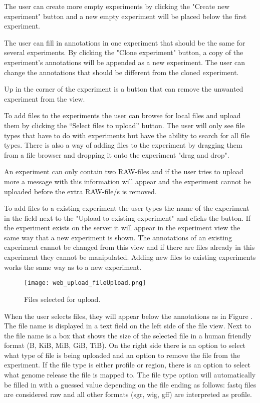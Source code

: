 The user can create more empty experiments by clicking the "Create new experiment" button and a new empty experiment will be placed below the first experiment.

The user can fill in annotations in one experiment that should be the same for several experiments. By clicking the "Clone experiment" button, a copy of the experiment's annotations will be appended as a new experiment. The user can change the annotations that should be different from the cloned experiment.

Up in the corner of the experiment is a button that can remove the unwanted experiment from the view. 

To add files to the experiments the user can browse for local files and upload them by clicking the “Select files to upload” button. The user will only see file types that have to do with experiments but have the ability to search for all file types. There is also a way of adding files to the experiment by dragging them from a file browser and dropping it onto the experiment "drag and drop".

An experiment can only contain two RAW-files and if the user tries to upload more a message with this information will appear and the experiment cannot be uploaded before the extra RAW-file/s is removed. 

To add files to a existing experiment the user types the name of the experiment in the field next to the "Upload to existing experiment" and clicks the button. If the experiment exists on the server it will appear in the experiment view the same way that a new experiment is shown. The annotations of an existing experiment cannot be changed from this view and if there are files already in this experiment they cannot be manipulated. Adding new files to existing experiments works the same way as to a new experiment.

\begin{figure}[h]
\centering
\texttt{[image: web\_upload\_fileUpload.png]}
\caption{\label{fig:web_upload_fileUpload}Files selected for upload.}
\end{figure}
 
When the user selects files, they will appear below the annotations as in Figure . The file name is displayed in a text field on the left side of the file view. Next to the file name is a box that shows the size of the selected file in a human friendly format (B, KiB, MiB, GiB, TiB). On the right side there is an option to select what type of file is being uploaded and an option to remove the file from the experiment. If the file type is either profile or region, there is an option to select what genome release the file is mapped to. The file type option will automatically be filled in with a guessed value depending on the file ending as follows: fastq files are considered raw and all other formats (sgr, wig, gff) are interpreted as profile.

